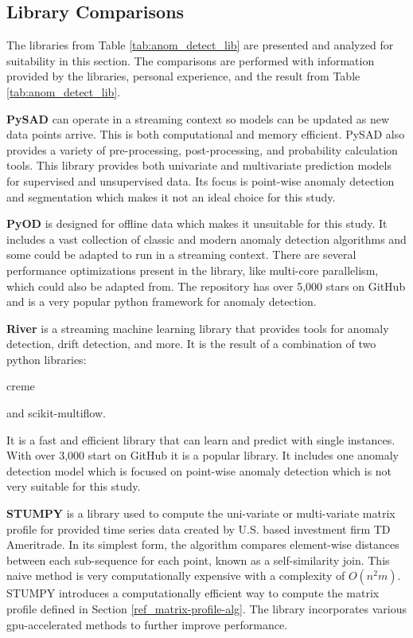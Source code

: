 


\subsection{Library Comparisons}

The libraries from Table \ref{tab:anom_detect_lib} are presented and analyzed for suitability in this section. The comparisons are performed with information provided by the libraries, personal experience, and the result from Table \ref{tab:anom_detect_lib}.

\textbf{PySAD} \parencite{pysad} can operate in a streaming context so models can be updated as new data points arrive. This is both computational and memory efficient. PySAD also provides a variety of pre-processing, post-processing, and probability calculation tools. This library provides both univariate and multivariate prediction models for supervised and unsupervised data. Its focus is point-wise anomaly detection and segmentation which makes it not an ideal choice for this study.


\textbf{PyOD} \parencite{zhao2019pyod} is designed for offline data which makes it unsuitable for this study. It includes a vast collection of classic and modern anomaly detection algorithms and some could be adapted to run in a streaming context. There are several performance optimizations present in the library, like multi-core parallelism, which could also be adapted from. The repository has over 5,000 stars on GitHub and is a very popular python framework for anomaly detection.

\textbf{River} \parencite{2020river} is a streaming machine learning library that provides tools for anomaly detection, drift detection, and more. It is the result of a combination of two python libraries: 
\begin{inlinelist}
    \item creme
    \item and scikit-multiflow.
\end{inlinelist} It is a fast and efficient library that can learn and predict with single instances. With over 3,000 start on GitHub it is a popular library. It includes one anomaly detection model which is focused on point-wise anomaly detection which is not very suitable for this study.

\textbf{STUMPY} \parencite{law2019stumpy} is a library used to compute the uni-variate or multi-variate matrix profile for provided time series data created by U.S. based investment firm TD Ameritrade. In its simplest form, the algorithm compares element-wise distances between each sub-sequence for each point, known as a self-similarity join. This naive method is very computationally expensive with a complexity of $O(n^2m)$. STUMPY introduces a computationally efficient way to compute the matrix profile defined in Section \ref{ref_matrix-profile-alg}. The library incorporates various gpu-accelerated methods to further improve performance.

